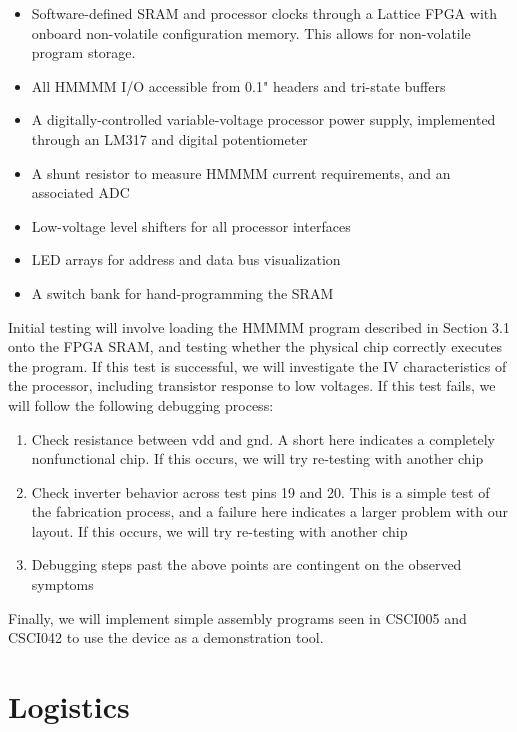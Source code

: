 \documentclass[12pt]{article}
\begin{document}
\begin{itemize}
    \item Software-defined SRAM and processor clocks through a Lattice FPGA with onboard non-volatile configuration memory. This allows for non-volatile program storage.
    \item All HMMMM I/O accessible from 0.1" headers and tri-state buffers
    \item A digitally-controlled variable-voltage processor power supply, implemented through an LM317 and digital potentiometer
    \item A shunt resistor to measure HMMMM current requirements, and an associated ADC
    \item Low-voltage level shifters for all processor interfaces
    \item LED arrays for address and data bus visualization
    \item A switch bank for hand-programming the SRAM
\end{itemize}

Initial testing will involve loading the HMMMM program described in Section 3.1 onto the FPGA SRAM, and testing whether the physical chip correctly executes the program. If this test is successful, we will investigate the IV characteristics of the processor, including transistor response to low voltages. If this test fails, we will follow the following debugging process:

\begin{enumerate}
    \item Check resistance between vdd and gnd. A short here indicates a completely nonfunctional chip. If this occurs, we will try re-testing with another chip
    \item Check inverter behavior across test pins 19 and 20. This is a simple test of the fabrication process, and a failure here indicates a larger problem with our layout. If this occurs, we will try re-testing with another chip
    \item Debugging steps past the above points are contingent on the observed symptoms
\end{enumerate}

Finally, we will implement simple assembly programs seen in CSCI005 and CSCI042 to use the device as a demonstration tool.

\section{Logistics}
\end{document}
